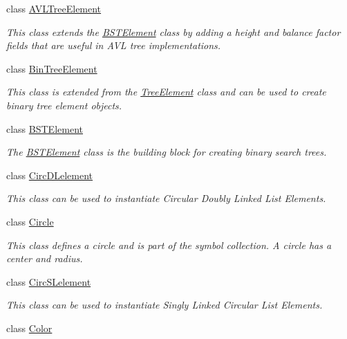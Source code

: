 \begin{DoxyCompactItemize}
class \hyperlink{classbridges_1_1base_1_1_a_v_l_tree_element}{A\+V\+L\+Tree\+Element}
\begin{DoxyCompactList}\small\item\em This class extends the \hyperlink{classbridges_1_1base_1_1_b_s_t_element}{B\+S\+T\+Element} class by adding a height and balance factor fields that are useful in A\+VL tree implementations. \end{DoxyCompactList}\item 
class \hyperlink{classbridges_1_1base_1_1_bin_tree_element}{Bin\+Tree\+Element}
\begin{DoxyCompactList}\small\item\em This class is extended from the \hyperlink{classbridges_1_1base_1_1_tree_element}{Tree\+Element} class and can be used to create binary tree element objects. \end{DoxyCompactList}\item 
class \hyperlink{classbridges_1_1base_1_1_b_s_t_element}{B\+S\+T\+Element}
\begin{DoxyCompactList}\small\item\em The \hyperlink{classbridges_1_1base_1_1_b_s_t_element}{B\+S\+T\+Element} class is the building block for creating binary search trees. \end{DoxyCompactList}\item 
class \hyperlink{classbridges_1_1base_1_1_circ_d_lelement}{Circ\+D\+Lelement}
\begin{DoxyCompactList}\small\item\em This class can be used to instantiate Circular Doubly Linked List Elements. \end{DoxyCompactList}\item 
class \hyperlink{classbridges_1_1base_1_1_circle}{Circle}
\begin{DoxyCompactList}\small\item\em This class defines a circle and is part of the symbol collection. A circle has a center and radius. \end{DoxyCompactList}\item 
class \hyperlink{classbridges_1_1base_1_1_circ_s_lelement}{Circ\+S\+Lelement}
\begin{DoxyCompactList}\small\item\em This class can be used to instantiate Singly Linked Circular List Elements. \end{DoxyCompactList}\item 
class \hyperlink{classbridges_1_1base_1_1_color}{Color}

\end{DoxyCompactItemize}
